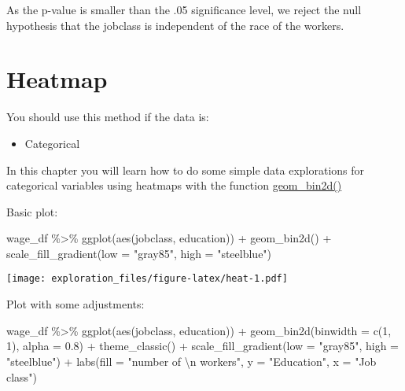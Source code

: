 \documentclass[
]{book}
\newenvironment{Shaded}{\begin{snugshade}}{\end{snugshade}}
\newcommand{\AttributeTok}[1]{\textcolor[rgb]{0.77,0.63,0.00}{#1}}
\newcommand{\DecValTok}[1]{\textcolor[rgb]{0.00,0.00,0.81}{#1}}
\newcommand{\FloatTok}[1]{\textcolor[rgb]{0.00,0.00,0.81}{#1}}
\newcommand{\FunctionTok}[1]{\textcolor[rgb]{0.00,0.00,0.00}{#1}}
\newcommand{\NormalTok}[1]{#1}
\newcommand{\SpecialCharTok}[1]{\textcolor[rgb]{0.00,0.00,0.00}{#1}}
\newcommand{\StringTok}[1]{\textcolor[rgb]{0.31,0.60,0.02}{#1}}
\providecommand{\tightlist}{%
  \setlength{\itemsep}{0pt}\setlength{\parskip}{0pt}}
\begin{document}
As the p-value is smaller than the .05 significance level, we reject the null hypothesis that the jobclass is independent of the race of the workers.

\hypertarget{heatmap}{%
\chapter{Heatmap}\label{heatmap}}

You should use this method if the data is:

\begin{itemize}
\tightlist
\item
  Categorical
\end{itemize}

In this chapter you will learn how to do some simple data explorations for categorical variables using heatmaps with the function \href{https://ggplot2.tidyverse.org/reference/geom_bin2d.html}{geom\_bin2d()}

Basic plot:

\begin{Shaded}
\begin{Highlighting}[]
\NormalTok{wage\_df }\SpecialCharTok{\%\textgreater{}\%}
  \FunctionTok{ggplot}\NormalTok{(}\FunctionTok{aes}\NormalTok{(jobclass, education)) }\SpecialCharTok{+}
  \FunctionTok{geom\_bin2d}\NormalTok{() }\SpecialCharTok{+}
  \FunctionTok{scale\_fill\_gradient}\NormalTok{(}\AttributeTok{low =} \StringTok{"gray85"}\NormalTok{, }\AttributeTok{high =} \StringTok{"steelblue"}\NormalTok{) }
\end{Highlighting}
\end{Shaded}

\texttt{[image: exploration\_files/figure-latex/heat-1.pdf]}

Plot with some adjustments:

\begin{Shaded}
\begin{Highlighting}[]
\NormalTok{wage\_df }\SpecialCharTok{\%\textgreater{}\%}
  \FunctionTok{ggplot}\NormalTok{(}\FunctionTok{aes}\NormalTok{(jobclass, education)) }\SpecialCharTok{+}
  \FunctionTok{geom\_bin2d}\NormalTok{(}\AttributeTok{binwidth =} \FunctionTok{c}\NormalTok{(}\DecValTok{1}\NormalTok{, }\DecValTok{1}\NormalTok{), }\AttributeTok{alpha =} \FloatTok{0.8}\NormalTok{) }\SpecialCharTok{+}
  \FunctionTok{theme\_classic}\NormalTok{() }\SpecialCharTok{+} 
  \FunctionTok{scale\_fill\_gradient}\NormalTok{(}\AttributeTok{low =} \StringTok{"gray85"}\NormalTok{, }\AttributeTok{high =} \StringTok{"steelblue"}\NormalTok{) }\SpecialCharTok{+}
  \FunctionTok{labs}\NormalTok{(}\AttributeTok{fill =} \StringTok{"number of }\SpecialCharTok{\textbackslash{}n}\StringTok{ workers"}\NormalTok{, }\AttributeTok{y =} \StringTok{"Education"}\NormalTok{, }\AttributeTok{x =} \StringTok{"Job class"}\NormalTok{)}
\end{Highlighting}
\end{Shaded}
\end{document}
